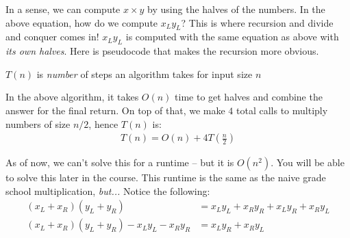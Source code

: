 \documentclass[14pt]{extarticle}
\begin{document}
    In a sense, we can compute $x \times y$ by using the halves of the numbers.
    In the above equation, how do we compute $x_L y_L$? This is where recursion
    and divide and conquer comes in! $x_L y_L$ is computed with the same
    equation as above with \textit{its own halves}. Here is pseudocode that
    makes the recursion more obvious.
    \newcommand\mycommfont[1]{\footnotesize\ttfamily\textcolor{blue}{#1}}
    \begin{algorithm}
    \end{algorithm}

    \begin{definition}
        $T(n)$ is \textit{number} of steps an algorithm takes for input size $n$
    \end{definition}

    In the above algorithm, it takes $O(n)$ time to get halves and combine
    the answer for the final return. On top of that, we make $4$ total
    calls to multiply numbers of size $n/2$, hence $T(n)$ is:
    \begin{align*}
        T(n) = O(n) + 4T\left(\frac{n}{2}\right)
    \end{align*}

    As of now, we can't solve this for a runtime -- but it is $O(n^2)$. You
    will be able to solve this later in the course. This runtime is the same
    as the naive grade school multiplication, \textit{but...}
    Notice the following:
    \begin{align*}
        (x_L + x_R)(y_L + y_R) &= x_Ly_L + x_Ry_R + x_Ly_R + x_Ry_L\\
        (x_L + x_R)(y_L + y_R) - x_Ly_L - x_Ry_R &= x_Ly_R + x_Ry_L
    \end{align*}
  
\end{document}
